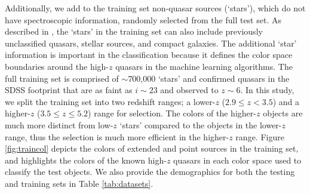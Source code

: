 \documentclass[apj, numberedappendix]{emulateapj}
\begin{document}
Additionally, we add to the training set non-quasar sources (`stars'), which do not have spectroscopic information, randomly selected from the full test set. As described in \citet{Richards2015}, the `stars' in the training set can also include previously unclassified quasars, stellar sources, and compact galaxies. The additional `star' information is important in the classification because it defines the color space boundaries around the high-$z$ quasars in the machine learning algorithms. The full training set is comprised of $\sim${700,000} `stars' and confirmed quasars in the SDSS footprint that are as faint as $i \sim 23$ and observed to $z \sim6$. In this study, we split the training set into two redshift ranges; a lower-$z$ ($2.9 \leq z < 3.5$) and a higher-$z$ ($3.5 \leq z \leq 5.2$) range for selection. The colors of the higher-$z$ objects are much more distinct from low-$z$ `stars' compared to the objects in the lower-$z$ range, thus the selection is much more efficient in the higher-$z$ range. Figure \ref{fig:traincol} depicts the colors of extended and point sources in the training set, and highlights the colors of the known high-$z$ quasars in each color space used to classify the test objects. We also provide the demographics for both the testing and training sets in Table \ref{tab:datasets}.
\end{document}
